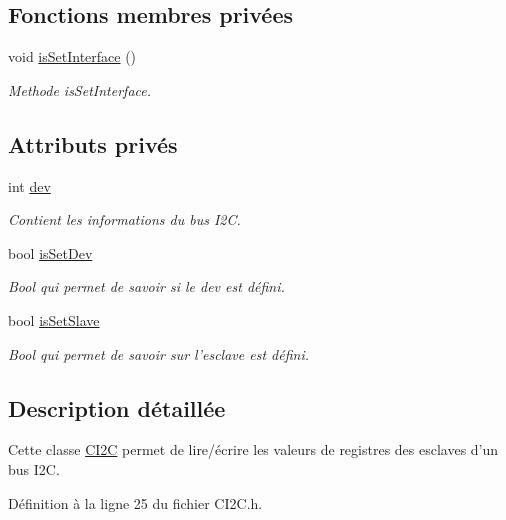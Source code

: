 \subsection*{Fonctions membres privées}
\begin{DoxyCompactItemize}
\item 
void \hyperlink{class_c_i2_c_a821adb4a309a1377fef4d1b8487a731e}{is\+Set\+Interface} ()
\begin{DoxyCompactList}\small\item\em Methode is\+Set\+Interface. \end{DoxyCompactList}\end{DoxyCompactItemize}
\subsection*{Attributs privés}
\begin{DoxyCompactItemize}
\item 
int \hyperlink{class_c_i2_c_ae2d4648eadc2acae86a49cecbf39ce56}{dev}
\begin{DoxyCompactList}\small\item\em Contient les informations du bus I2\+C. \end{DoxyCompactList}\item 
bool \hyperlink{class_c_i2_c_a892d111f995589334497f2b573ab436d}{is\+Set\+Dev}
\begin{DoxyCompactList}\small\item\em Bool qui permet de savoir si le dev est défini. \end{DoxyCompactList}\item 
bool \hyperlink{class_c_i2_c_a19200c12efe17b560256641cce4f5909}{is\+Set\+Slave}
\begin{DoxyCompactList}\small\item\em Bool qui permet de savoir sur l'esclave est défini. \end{DoxyCompactList}\end{DoxyCompactItemize}


\subsection{Description détaillée}
Cette classe \hyperlink{class_c_i2_c}{C\+I2\+C} permet de lire/écrire les valeurs de registres des esclaves d'un bus I2\+C. 

Définition à la ligne 25 du fichier C\+I2\+C.\+h.



